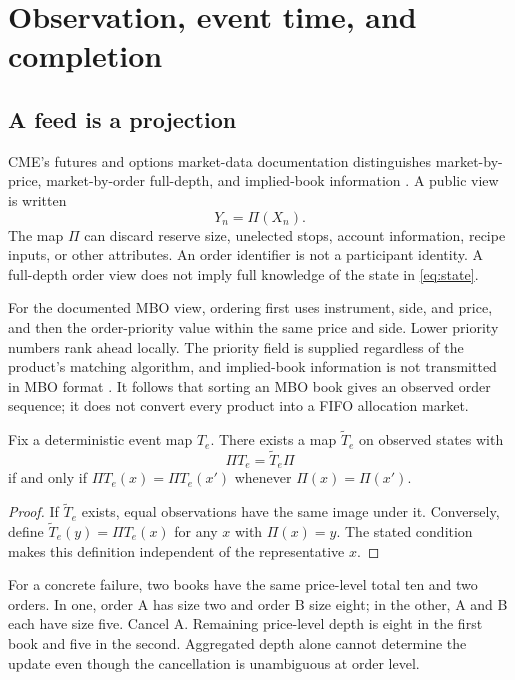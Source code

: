 \section{Observation, event time, and completion}
\label{sec:observation}

\subsection{A feed is a projection}

CME's futures and options market-data documentation distinguishes market-by-price, market-by-order full-depth, and implied-book information \citep{CMEMDP}. A public view is written
\begin{equation}
 Y_n=\Pi(X_n).
\end{equation}
The map $\Pi$ can discard reserve size, unelected stops, account information, recipe inputs, or other attributes. An order identifier is not a participant identity. A full-depth order view does not imply full knowledge of the state in \eqref{eq:state}.

For the documented MBO view, ordering first uses instrument, side, and price, and then the order-priority value within the same price and side. Lower priority numbers rank ahead locally. The priority field is supplied regardless of the product's matching algorithm, and implied-book information is not transmitted in MBO format \citep{CMEMBO}. It follows that sorting an MBO book gives an observed order sequence; it does not convert every product into a FIFO allocation market.

\begin{proposition}\label{prop:projection}
Fix a deterministic event map $T_e$. There exists a map $\widetilde T_e$ on observed states with
\begin{equation}
 \Pi T_e=\widetilde T_e\Pi
\end{equation}
if and only if $\Pi T_e(x)=\Pi T_e(x')$ whenever $\Pi(x)=\Pi(x')$.
\end{proposition}
\begin{proof}
If $\widetilde T_e$ exists, equal observations have the same image under it. Conversely, define $\widetilde T_e(y)=\Pi T_e(x)$ for any $x$ with $\Pi(x)=y$. The stated condition makes this definition independent of the representative $x$.
\end{proof}

For a concrete failure, two books have the same price-level total ten and two orders. In one, order A has size two and order B size eight; in the other, A and B each have size five. Cancel A. Remaining price-level depth is eight in the first book and five in the second. Aggregated depth alone cannot determine the update even though the cancellation is unambiguous at order level.

